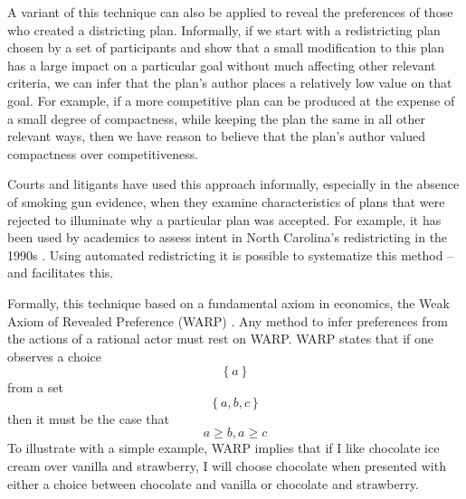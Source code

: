 \documentclass[article]{JSSstyle/jss}
\begin{document}
A variant of this technique can also be applied to reveal the
preferences of those who created a districting plan. Informally, if we
start with a redistricting plan chosen by a set of participants and
show that a small modification to this plan has a large impact on 
a particular goal without much affecting other relevant criteria, we can infer that the plan's author places a relatively low
value on that goal. For example, if a more competitive plan can be produced at the expense
of a small degree of compactness, while keeping the plan the same in all other
relevant ways, then we have reason to believe that the plan's author 
valued compactness over competitiveness. 

Courts and litigants have used this approach informally, especially in the
absence of smoking gun evidence, when they examine characteristics of
plans that were rejected to illuminate why a particular plan was
accepted. For example, it has been used by academics to assess
intent in North Carolina's redistricting in the 1990s \citep[][]{GronWil99}. Using automated redistricting it is possible to
systematize this method -- and  facilitates this. 

Formally, this technique based on a fundamental axiom in economics, the Weak Axiom
of Revealed Preference (WARP) \citep[][]{Samuelson48}. Any method to infer preferences
from the actions of a rational actor must rest on WARP.  WARP states
that if one observes a choice 
\[
\left\{ a \right\}
\]
 from a set 
\[
\left\{ {a,b,c} \right\}
\]
  then it must be the case that
\[
a \ge b,a \ge c
\]
To illustrate with a simple example, WARP implies that if I like
chocolate ice cream over vanilla and strawberry, I will choose
chocolate when presented with either a choice between chocolate and
vanilla or chocolate and strawberry. 
\end{document}

